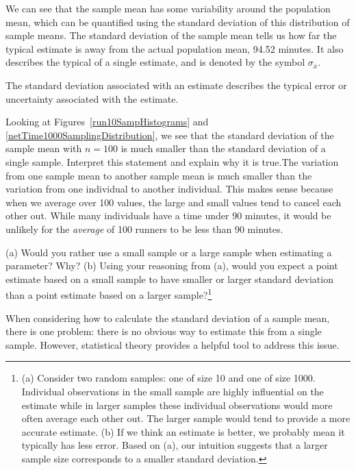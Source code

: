 We can see that the sample mean has some variability around the population mean, which can be quantified using the standard deviation of this distribution of sample means. The standard deviation of the sample mean tells us how far the typical estimate is away from the actual population mean, 94.52 minutes.  It also describes the typical  of a single estimate, and is denoted by the symbol $\sigma_{\bar{x}}$. 

\begin{termBox}{
The standard deviation associated with an estimate describes the typical error or uncertainty associated with the estimate.}
\end{termBox}

\begin{example}{Looking at Figures~\ref{run10SampHistograms} and \ref{netTime1000SamplingDistribution}, we see that the standard deviation of the sample mean with $n=100$ is much smaller than the standard deviation of a single sample.  Interpret this statement and explain why it is true.}The variation from one sample mean to another sample mean is much smaller than the variation from one individual to another individual.  This makes sense because when we average over 100 values, the large and small values tend to cancel each other out.  While many individuals have a time under 90 minutes, it would be unlikely for the \emph{average} of 100 runners to be less than 90 minutes.
\end{example}

\begin{exercise}
(a) Would you rather use a small sample or a large sample when estimating a parameter? Why? (b) Using your reasoning from (a), would you expect a point estimate based on a small sample to have smaller or larger standard deviation than a point estimate based on a larger sample?\footnote{(a) Consider two random samples: one of size 10 and one of size 1000. Individual observations in the small sample are highly influential on the estimate while in larger samples these individual observations would more often average each other out. The larger sample would tend to provide a more accurate estimate. (b) If we think an estimate is better, we probably mean it typically has less error. Based on (a), our intuition suggests that a larger sample size corresponds to a smaller standard deviation.}
\end{exercise}

When considering how to calculate the standard deviation of a sample mean, there is one problem: there is no obvious way to estimate this from a single sample.  However, statistical theory provides a helpful tool to address this issue.

